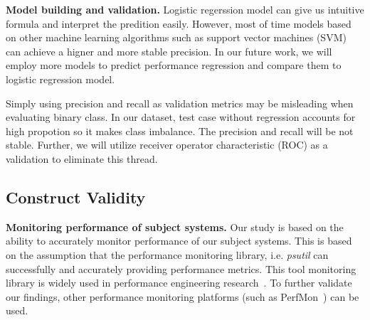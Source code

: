 \textbf{Model building and validation.} 
Logistic regerssion model can give us intuitive formula and  interpret the predition easily. However, most of time models based on other machine learning algorithms such as support vector machines (SVM) can achieve a higner and more stable precision. In our future work, we will employ more models to predict performance regression and compare them to logistic regression model.

Simply using precision and recall as validation metrics may be misleading when evaluating binary class. In our dataset, test case without regression accounts for high propotion so it makes class imbalance. The precision and recall will be not stable.  Further, we will utilize receiver operator characteristic (ROC) as a validation to eliminate this thread.
\subsection{Construct Validity}

\textbf{Monitoring performance of subject systems.} Our study is based on the ability to accurately monitor performance of our subject systems. This is based on the assumption that the performance monitoring library, i.e. \emph{psutil} can successfully and accurately providing performance metrics. This tool monitoring library is widely used in performance engineering research~\cite{peterfse,tarekmsr16}. To further validate our findings, other performance monitoring platforms (such as PerfMon~\cite{perfmon}) can be used. 



